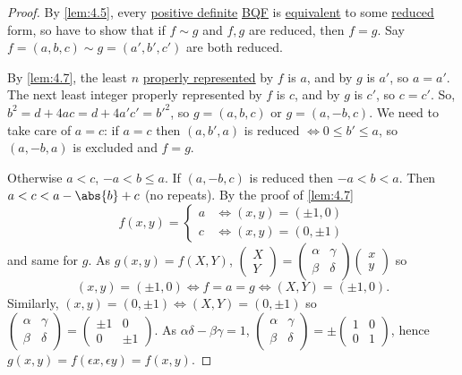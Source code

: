 \documentclass{article}
\begin{document}
\begin{proof}
    By \cref{lem:4.5}, every \hyperlink{def:definite}{positive definite} \hyperlink{def:bqf}{BQF} is \hyperlink{def:uniSub}{equivalent} to some \hyperlink{def:reduced}{reduced} form, so have to show that if $f \sim g$ and $f, g$ are reduced, then $f = g$.
    Say $f = (a, b, c) \sim g=(a', b', c')$ are both reduced.

    By \cref{lem:4.7}, the least $n$ \hyperlink{def:propRep}{properly represented} by $f$ is $a$, and by $g$ is $a'$, so $a = a'$.
    The next least integer properly represented by $f$ is $c$, and by $g$ is $c'$, so $c = c'$.
    So, $b^2 = d + 4ac = d + 4a'c' = b'^2$, so $g = (a, b, c)$ or $g = (a, -b, c)$.
    We need to take care of $a=c$: if $a = c$ then $(a, b', a)$ is reduced $\iff 0 \leq b' \leq a$, so $(a, -b, a)$ is excluded and $f = g$.

    Otherwise $a < c$, $-a < b \leq a$.
    If $(a, -b, c)$ is reduced then $-a < b < a$.
    Then $a < c < a - \abs{b} + c$ (no repeats).
    By the proof of \cref{lem:4.7}
    \begin{equation*}
        f(x, y) =
        \begin{cases}
            a & \iff (x, y) = (\pm 1, 0) \\
            c & \iff (x, y) = (0, \pm 1)
        \end{cases}
    \end{equation*}
    and same for $g$.
    As $g(x, y) = f(X, Y)$, $\begin{pmatrix} X \\ Y \end{pmatrix}=\begin{pmatrix}\alpha & \gamma \\ \beta & \delta\end{pmatrix} \begin{pmatrix} x \\ y\end{pmatrix}$ so
    \begin{equation*}(x, y) = (\pm 1, 0) \Longleftrightarrow f=a=g \Longleftrightarrow (X, Y) = (\pm 1, 0).\end{equation*}
    Similarly, $(x,y) = (0, \pm 1) \Longleftrightarrow (X, Y) = (0, \pm 1)$ so $\begin{pmatrix}\alpha & \gamma \\ \beta & \delta\end{pmatrix} = \begin{pmatrix}\pm 1 & 0 \\ 0 & \pm 1\end{pmatrix}$.
    As $\alpha \delta - \beta \gamma = 1$, $\begin{pmatrix}\alpha & \gamma \\ \beta & \delta\end{pmatrix} = \pm \begin{pmatrix}1 & 0 \\ 0 & 1 \end{pmatrix}$, hence $g(x, y) = f(\epsilon x, \epsilon y) = f(x, y)$.
\end{proof}
\end{document}
